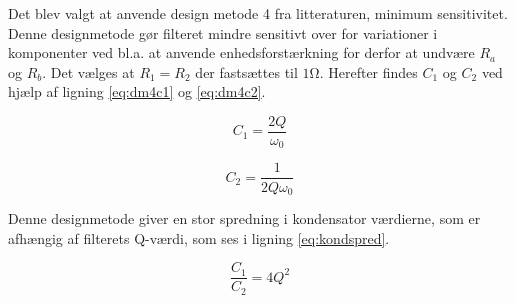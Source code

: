 Det blev valgt at anvende design metode 4 fra litteraturen, minimum sensitivitet.
Denne designmetode gør filteret mindre sensitivt over for variationer i komponenter ved bl.a.
at anvende enhedsforstærkning for derfor at undvære $R_a$ og $R_b$.
Det vælges at $R_1 = R_2$ der fastsættes til $1\si{\ohm}$. Herefter findes $C_1$ og $C_2$ ved hjælp af ligning \ref{eq:dm4c1} og \ref{eq:dm4c2}.

\vspace{15pt}

\begin{minipage}{0.5\linewidth}
	\begin{equation}
	\label{eq:dm4c1}
	C_1 = \frac{2Q}{\omega_0}
	\end{equation}
\end{minipage}
\begin{minipage}{0.5\linewidth}
	\begin{equation}
	\label{eq:dm4c2}
	C_2 = \frac{1}{2Q\omega_0}
	\end{equation}
\end{minipage}

\vspace{15pt}

Denne designmetode giver en stor spredning i kondensator værdierne, som er afhængig af filterets Q-værdi, som ses i ligning
\ref{eq:kondspred}.

\begin{equation}
\label{eq:kondspred}
\frac{C_1}{C_2} = 4Q^2
\end{equation}

